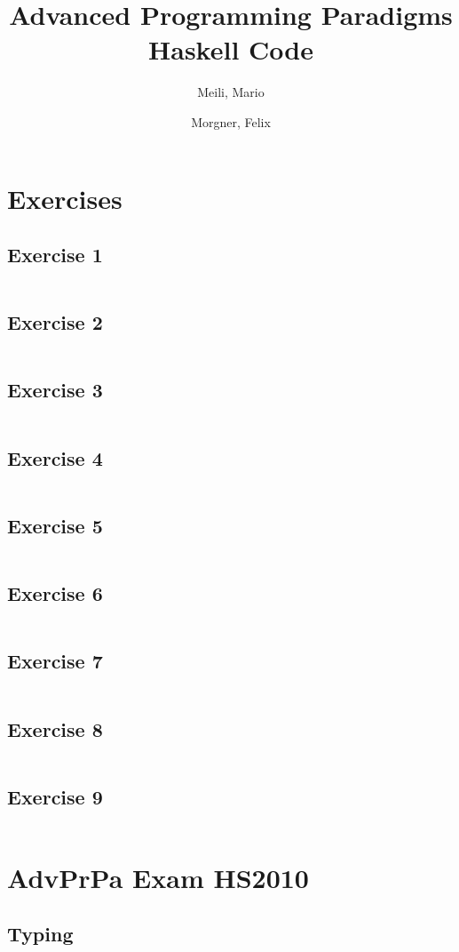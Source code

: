 \documentclass[a4paper,9pt,twoside]{book}
\title{%
Advanced Programming Paradigms\\\vspace{0.5cm}
\Large{Haskell Code}
}
\author{%
  Meili, Mario\\
  \and
  Morgner, Felix
}
\newcommand{\hsfile}[1]{\inputminted[breaklines]{haskell}{../haskell/#1.hs}}
\begin{document}
\maketitle{}
\tableofcontents{}

\chapter{Exercises}
\section{Exercise 1}
\hsfile{ex01/ex01}
\section{Exercise 2}
\hsfile{ex02/ex02}
\section{Exercise 3}
\hsfile{ex03/ex03}
\section{Exercise 4}
\hsfile{ex04/ex04}
\section{Exercise 5}
\hsfile{ex05/ex05}
\section{Exercise 6}
\hsfile{ex06/ex06}
\section{Exercise 7}
\hsfile{ex07/ex07}
\section{Exercise 8}
\hsfile{ex08/ex08}
\section{Exercise 9}
\hsfile{ex09/ex09}

\chapter{AdvPrPa Exam HS2010}
\section{Typing}
\hsfile{exam2010/problem_1}
\end{document}
